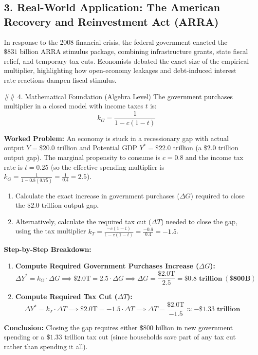 \documentclass[11pt,letterpaper]{article}
\begin{document}
\subsection*{3. Real-World Application: The American Recovery and Reinvestment Act (ARRA)}
In response to the 2008 financial crisis, the federal government enacted the $\$831\text{ billion}$ ARRA stimulus package, combining infrastructure grants, state fiscal relief, and temporary tax cuts. Economists debated the exact size of the empirical multiplier, highlighting how open-economy leakages and debt-induced interest rate reactions dampen fiscal stimulus.

## 4. Mathematical Foundation (Algebra Level)
The government purchases multiplier in a closed model with income taxes $t$ is:
\begin{equation}
k_G = \frac{1}{1 - c(1 - t)}
\end{equation}

\noindent\textbf{Worked Problem:}
An economy is stuck in a recessionary gap with actual output $Y = \$20.0\text{ trillion}$ and Potential GDP $Y^* = \$22.0\text{ trillion}$ (a $\$2.0\text{ trillion}$ output gap). The marginal propensity to consume is $c = 0.8$ and the income tax rate is $t = 0.25$ (so the effective spending multiplier is $k_G = \frac{1}{1 - 0.8(0.75)} = \frac{1}{0.4} = 2.5$).
\begin{enumerate}
    \item Calculate the exact increase in government purchases ($\Delta G$) required to close the $\$2.0\text{ trillion}$ output gap.
    \item Alternatively, calculate the required tax cut ($\Delta T$) needed to close the gap, using the tax multiplier $k_T = \frac{-c(1-t)}{1 - c(1-t)} = \frac{-0.6}{0.4} = -1.5$.
\end{enumerate}

\noindent\textbf{Step-by-Step Breakdown:}
\begin{enumerate}
    \item \textbf{Compute Required Government Purchases Increase ($\Delta G$):}
    \[
    \Delta Y^* = k_G \cdot \Delta G \implies \$2.0\text{T} = 2.5 \cdot \Delta G \implies \Delta G = \frac{\$2.0\text{T}}{2.5} = \mathbf{\$0.8\text{ trillion}\ (\$800\text{B})}
    \]

    \item \textbf{Compute Required Tax Cut ($\Delta T$):}
    \[
    \Delta Y^* = k_T \cdot \Delta T \implies \$2.0\text{T} = -1.5 \cdot \Delta T \implies \Delta T = \frac{\$2.0\text{T}}{-1.5} \approx \mathbf{-\$1.33\text{ trillion}}
    \]
\end{enumerate}
\textbf{Conclusion:} Closing the gap requires either $\$800\text{ billion}$ in new government spending or a $\$1.33\text{ trillion}$ tax cut (since households save part of any tax cut rather than spending it all).
\end{document}
